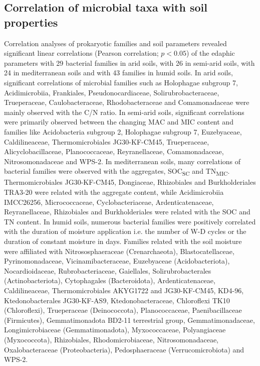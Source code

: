 \subsection{Correlation of microbial taxa with soil properties}

Correlation analyses of prokaryotic families and soil parameters revealed significant linear correlations (Pearson correlation; \(p < 0.05\)) of the edaphic parameters with 29 bacterial families in arid soils, with 26 in semi-arid soils, with 24 in mediterranean soils and with 43 families in humid soils. In arid soils, significant correlations of microbial families such as Holophagae subgroup 7, Acidimicrobiia, Frankiales, Pseudonocardiaceae, Solirubrobacteraceae, Trueperaceae, Caulobacteraceae, Rhodobacteraceae and Comamonadaceae were mainly observed with the C/N ratio. In semi-arid soils, significant correlations were primarily observed between the changing MAC and MIC content and families like Acidobacteria subgroup 2, Holophagae subgroup 7, Euzebyaceae, Caldilineaceae, Thermomicrobiales JG30-KF-CM45, Trueperaceae, Alicyclobacillaceae, Planococcaceae, Reyranellaceae, Comamonadaceae, Nitrosomonadaceae and WPS-2. In mediterranean soils, many correlations of bacterial families were observed with the aggregates, SOC\textsubscript{SC} and TN\textsubscript{MIC}. Thermomicrobiales JG30-KF-CM45, Dongiaceae, Rhizobiales and Burkholderiales TRA3-20 were related with the aggregate content, while Acidimicrobiia IMCC26256, Micrococcaceae, Cyclobacteriaceae, Ardenticatenaceae, Reyranellaceae, Rhizobiales and Burkholderiales were related with the SOC and TN content. In humid soils, numerous bacterial families were positively correlated with the duration of moisture application i.e. the number of W-D cycles or the duration of constant moisture in days. Families related with the soil moisture were affiliated with Nitrososphaeraceae (Crenarchaeota), Blastocatellaceae, Pyrinomonadaceae, Vicinamibacteraceae, Euzebyaceae (Acidobacteriota), Nocardioidaceae, Rubrobacteriaceae, Gaiellales, Solirubrobacterales (Actinobacteriota), Cytophagales (Bacteroidota), Ardenticatenaceae, Caldilineaceae, Thermomicrobiales AKYG1722 and JG30-KF-CM45, KD4-96, Ktedonobacterales JG30-KF-AS9, Ktedonobacteraceae, Chloroflexi TK10 (Chloroflexi), Trueperaceae (Deinococcota), Planococcaceae, Paenibacillaceae (Firmicutes), Gemmatimonadota BD2-11 terrestrial group, Gemmatimonadaceae, Longimicrobiaceae (Gemmatimonadota), Myxococcaceae, Polyangiaceae (Myxococcota), Rhizobiales, Rhodomicrobiaceae, Nitrosomonadaceae, Oxalobacteraceae (Proteobacteria), Pedosphaeraceae (Verrucomicrobiota) and WPS-2.

